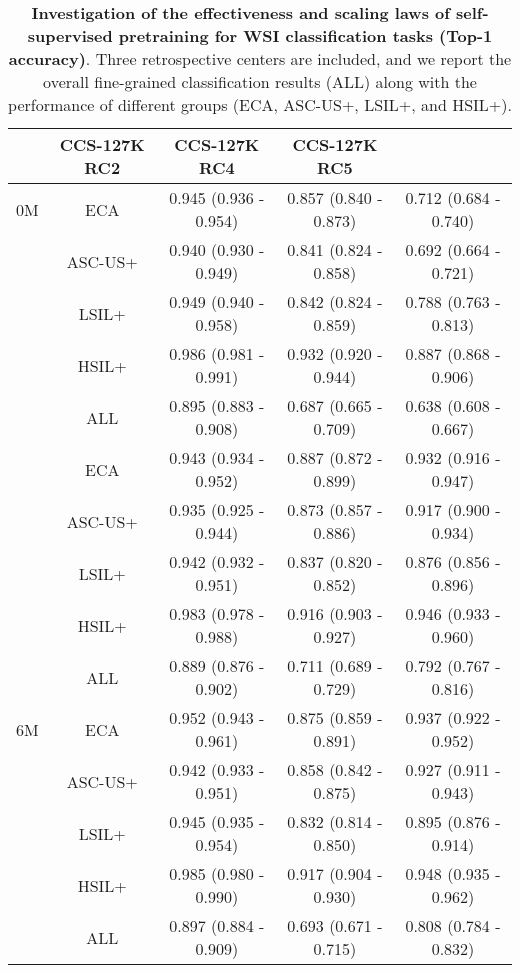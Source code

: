 \clearpage
\begin{table}[h] 
\renewcommand{\arraystretch}{1.5}
\renewcommand{\tablename}{Extended Data Table.}
\centering 
\caption{\textbf{Investigation of the effectiveness and scaling laws of self-supervised pretraining for WSI classification tasks (Top-1 accuracy)}. Three retrospective centers are included, and we report the overall fine-grained classification results (ALL) along with the performance of different groups (ECA, ASC-US+, LSIL+, and HSIL+).}
\begin{tabular}{cc|ccc} 
\hline
\rowcolor{cusyellow} \multicolumn{2}{c|}{\multirow{1}{*}{\textbf{Pretrain settings}}} & \textbf{CCS-127K RC2}& \textbf{CCS-127K RC4} & \textbf{CCS-127K RC5} \\ 
\hline
\multirow{1}{*}{0M }&ECA &0.945 (0.936 - 0.954) &0.857 (0.840 - 0.873)& 0.712 (0.684 - 0.740)\\
& ASC-US+  & 0.940 (0.930 - 0.949) & 0.841 (0.824 - 0.858) & 0.692 (0.664 - 0.721)\\
& LSIL+ & 0.949 (0.940 - 0.958) & 0.842 (0.824 - 0.859) & 0.788 (0.763 - 0.813) \\
& HSIL+ & 0.986 (0.981 - 0.991) & 0.932 (0.920 - 0.944) & 0.887 (0.868 - 0.906) \\
& ALL & 0.895 (0.883 - 0.908) & 0.687 (0.665 - 0.709) & 0.638 (0.608 - 0.667) \\

 \rowcolor{cusyellowl} \multirow{1}{*}{1M}&ECA & 0.943 (0.934 - 0.952) & 0.887 (0.872 - 0.899) & 0.932 (0.916 - 0.947) \\
\rowcolor{cusyellowl} & ASC-US+ & 0.935 (0.925 - 0.944) & 0.873 (0.857 - 0.886) & 0.917 (0.900 - 0.934) \\
\rowcolor{cusyellowl} & LSIL+  & 0.942 (0.932 - 0.951) & 0.837 (0.820 - 0.852)  & 0.876 (0.856 - 0.896) \\
\rowcolor{cusyellowl} & HSIL+   & 0.983 (0.978 - 0.988) & 0.916 (0.903 - 0.927)  & 0.946 (0.933 - 0.960)\\
\rowcolor{cusyellowl} & ALL     & 0.889 (0.876 - 0.902) & 0.711 (0.689 - 0.729)  & 0.792 (0.767 - 0.816)\\

\multirow{1}{*}{6M}&ECA  & 0.952 (0.943 - 0.961) & 0.875 (0.859 - 0.891)& 0.937 (0.922 - 0.952) \\
&ASC-US+  & 0.942 (0.933 - 0.951) & 0.858 (0.842 - 0.875) & 0.927 (0.911 - 0.943)\\
&LSIL+    & 0.945 (0.935 - 0.954) & 0.832 (0.814 - 0.850) & 0.895 (0.876 - 0.914)\\
&HSIL+   & 0.985 (0.980 - 0.990) & 0.917 (0.904 - 0.930) & 0.948 (0.935 - 0.962) \\
&ALL     & 0.897 (0.884 - 0.909) & 0.693 (0.671 - 0.715) & 0.808 (0.784 - 0.832) \\


\end{tabular}
\end{table}
